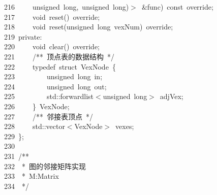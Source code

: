 \documentclass{ctexart}
\newcommand{\hlstd}[1]{\textcolor[rgb]{0.2,0.2,0.2}{#1}}
\newcommand{\hlcom}[1]{\textcolor[rgb]{0.59,0.59,0.59}{#1}}
\newcommand{\hlopt}[1]{\textcolor[rgb]{0.2,0.2,0.2}{#1}}
\newcommand{\hllin}[1]{\textcolor[rgb]{0.59,0.59,0.59}{#1}}
\newcommand{\hlkwb}[1]{\textcolor[rgb]{0.63,0,0.31}{#1}}
\newcommand{\hlkwc}[1]{\textcolor[rgb]{0,0.63,0.31}{#1}}
\newcommand{\hlkwd}[1]{\textcolor[rgb]{0.78,0.23,0.41}{#1}}
\begin{document}
\hllin{216\ }\hlstd{}\hlstd{\ \ \ \ }\hlstd{}\hlkwb{unsigned\ long}\hlstd{}\hlopt{,\ }\hlstd{}\hlkwb{unsigned\ long}\hlstd{}\hlopt{)$>$\ \&}\hlstd{func}\hlopt{)\ }\hlstd{}\hlkwb{const\ }\hlstd{override}\hlopt{;}\\
\hllin{217\ }\hlstd{}\hlstd{\ \ \ \ }\hlstd{}\hlkwb{void\ }\hlstd{}\hlkwd{reset}\hlstd{}\hlopt{()\ }\hlstd{override}\hlopt{;}\\
\hllin{218\ }\hlstd{}\hlstd{\ \ \ \ }\hlstd{}\hlkwb{void\ }\hlstd{}\hlkwd{reset}\hlstd{}\hlopt{(}\hlstd{}\hlkwb{unsigned\ long\ }\hlstd{vexNum}\hlopt{)\ }\hlstd{override}\hlopt{;}\\
\hllin{219\ }\hlstd{}\hlkwc{private}\hlstd{}\hlopt{:}\\
\hllin{220\ }\hlstd{}\hlstd{\ \ \ \ }\hlstd{}\hlkwb{void\ }\hlstd{}\hlkwd{clear}\hlstd{}\hlopt{()\ }\hlstd{override}\hlopt{;}\\
\hllin{221\ }\hlstd{}\hlstd{\ \ \ \ }\hlstd{}\hlcom{/{*}{*}\ 顶点表的数据结构\ {*}/}\hlstd{}\\
\hllin{222\ }\hlstd{}\hlstd{\ \ \ \ }\hlstd{}\hlkwc{typedef\ }\hlstd{}\hlkwb{struct\ }\hlstd{VexNode\ }\hlopt{\{}\\
\hllin{223\ }\hlstd{}\hlstd{\ \ \ \ \ \ \ \ }\hlstd{}\hlkwb{unsigned\ long\ }\hlstd{in}\hlopt{;}\\
\hllin{224\ }\hlstd{}\hlstd{\ \ \ \ \ \ \ \ }\hlstd{}\hlkwb{unsigned\ long\ }\hlstd{out}\hlopt{;}\\
\hllin{225\ }\hlstd{}\hlstd{\ \ \ \ \ \ \ \ }\hlstd{}\hlkwc{std}\hlstd{}\hlopt{::}\hlstd{forward\textunderscore list}\hlopt{$<$}\hlstd{}\hlkwb{unsigned\ long}\hlstd{}\hlopt{$>$\ }\hlstd{adjVex}\hlopt{;}\\
\hllin{226\ }\hlstd{}\hlstd{\ \ \ \ }\hlstd{}\hlopt{\}\ }\hlstd{VexNode}\hlopt{;}\\
\hllin{227\ }\hlstd{}\hlstd{\ \ \ \ }\hlstd{}\hlcom{/{*}{*}\ 邻接表顶点\ {*}/}\hlstd{}\\
\hllin{228\ }\hlstd{}\hlstd{\ \ \ \ }\hlstd{}\hlkwc{std}\hlstd{}\hlopt{::}\hlstd{vector}\hlopt{$<$}\hlstd{VexNode}\hlopt{$>$\ }\hlstd{vexes}\hlopt{;}\\
\hllin{229\ }\hlstd{}\hlopt{\};}\\
\hllin{230\ }\hlstd{}\\
\hllin{231\ }\hlstd{}\hlcom{/{*}{*}}\\
\hllin{232\ }\hlcom{\ {*}\ 图的邻接矩阵实现}\\
\hllin{233\ }\hlcom{\ {*}\ M:Matrix}\\
\hllin{234\ }\hlcom{\ {*}/}\hlstd{}\\
\end{document}
